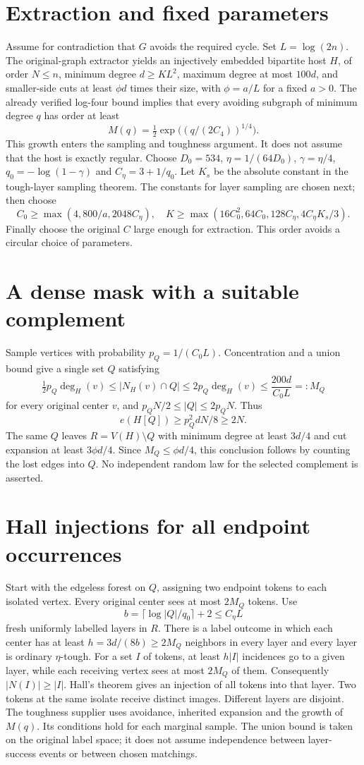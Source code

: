 \documentclass[11pt]{article}
\begin{document}
\section{Extraction and fixed parameters}
Assume for contradiction that $G$ avoids the required cycle. Set $L=\log(2n)$. The original-graph extractor yields an injectively embedded bipartite host $H$, of order $N\leq n$, minimum degree $d\geq KL^2$, maximum degree at most $100d$, and smaller-side cuts at least $\phi d$ times their size, with $\phi=a/L$ for a fixed $a>0$.
The already verified log-four bound implies that every avoiding subgraph of minimum degree $q$ has order at least
\[
 M(q)=\tfrac12\exp\bigl((q/(2C_4))^{1/4}\bigr).
\]
This growth enters the sampling and toughness argument. It does not assume that the host is exactly regular.
Choose $D_0=534$, $\eta=1/(64D_0)$, $\gamma=\eta/4$, $q_0=-\log(1-\gamma)$ and $C_\eta=3+1/q_0$. Let $K_s$ be the absolute constant in the tough-layer sampling theorem. The constants for layer sampling are chosen next; then choose
\[
 C_0\geq\max(4,800/a,2048C_\eta),\quad
 K\geq\max(16C_0^2,64C_0,128C_\eta,4C_\eta K_s/3).
\]
Finally choose the original $C$ large enough for extraction. This order avoids a circular choice of parameters.
\section{A dense mask with a suitable complement}
Sample vertices with probability $p_Q=1/(C_0L)$. Concentration and a union bound give a single set $Q$ satisfying
\[
 \tfrac12p_Q\deg_H(v)\leq |N_H(v)\cap Q|
 \leq2p_Q\deg_H(v)\leq\frac{200d}{C_0L}=:M_Q
\]
for every original center $v$, and $p_QN/2\leq|Q|\leq2p_QN$. Thus
\[
 e(H[Q])\geq p_Q^2dN/8\geq2N.
\]
The same $Q$ leaves $R=V(H)\setminus Q$ with minimum degree at least $3d/4$ and cut expansion at least $3\phi d/4$. Since $M_Q\leq\phi d/4$, this conclusion follows by counting the lost edges into $Q$. No independent random law for the selected complement is asserted.
\section{Hall injections for all endpoint occurrences}
Start with the edgeless forest on $Q$, assigning two endpoint tokens to each isolated vertex. Every original center sees at most $2M_Q$ tokens. Use
\[
 b=\lceil\log |Q|/q_0\rceil+2\leq C_\eta L
\]
fresh uniformly labelled layers in $R$. There is a label outcome in which each center has at least $h=3d/(8b)\geq2M_Q$ neighbors in every layer and every layer is ordinary $\eta$-tough.
For a set $I$ of tokens, at least $h|I|$ incidences go to a given layer, while each receiving vertex sees at most $2M_Q$ of them. Consequently $|N(I)|\geq|I|$. Hall's theorem gives an injection of all tokens into that layer. Two tokens at the same isolate receive distinct images. Different layers are disjoint.
The toughness supplier uses avoidance, inherited expansion and the growth of $M(q)$. Its conditions hold for each marginal sample. The union bound is taken on the original label space; it does not assume independence between layer-success events or between chosen matchings.
\end{document}
